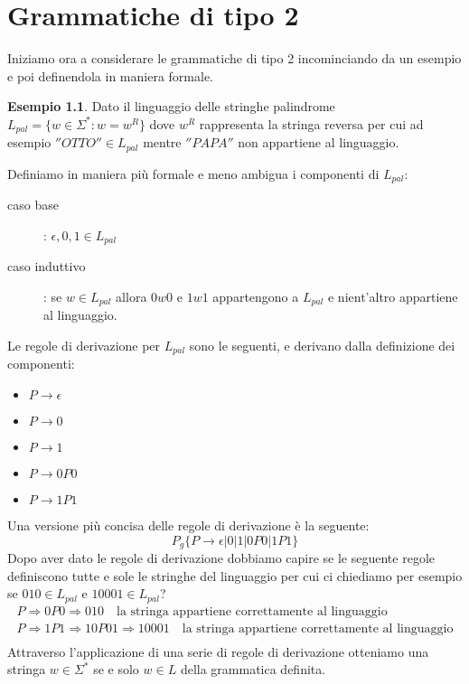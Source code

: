 \documentclass[a4paper]{book}
\theoremstyle{definition}%
\newtheorem*{esempio}{Esempio}
\begin{document}
\chapter{Grammatiche di tipo 2}
Iniziamo ora a considerare le grammatiche di tipo 2 incominciando da un esempio e poi definendola in maniera formale.
\begin{esempio}
  Dato il linguaggio delle stringhe palindrome $L _{pal} = \{w \in \Sigma ^ * : w = w ^ R\}$ dove $w^R$ rappresenta la stringa
  reversa per cui ad esempio $''OTTO'' \in L _ {pal}$ mentre $''PAPA''$ non appartiene al linguaggio.
 
  Definiamo in maniera più formale e meno ambigua i componenti di $L_{pal}$:
  \begin{description}
  \item [caso base]: $\epsilon, 0, 1 \in L_{pal}$
  \item [caso induttivo]: se $w \in L_{pal}$ allora $0w0$ e $1w1$ appartengono a $L_{pal}$ e nient'altro appartiene al linguaggio.
  \end{description}
  Le regole di derivazione per $L_{pal}$ sono le seguenti, e derivano dalla definizione dei componenti:
  \begin{itemize}
  \item $P \to \epsilon$
  \item $P \to 0$
  \item $P \to 1$
  \item $P \to 0P0$
  \item $P \to 1P1$
  \end{itemize}
  Una versione più concisa delle regole di derivazione è la seguente:
  \[ P_g\{P \to \epsilon | 0 | 1 | 0P0 | 1P1\} \]
  Dopo aver dato le regole di derivazione dobbiamo capire se le seguente regole definiscono tutte e sole le stringhe del linguaggio per cui ci chiediamo per esempio se $010 \in L_{pal}$ e $10001 \in L_{pal}$?
  \begin{align}
    P \Rightarrow 0P0 \Rightarrow 010  \quad \text{la stringa appartiene correttamente al linguaggio}\\
    P \Rightarrow 1P1 \Rightarrow 10P01 \Rightarrow 10001 \quad \text{la stringa appartiene correttamente al linguaggio}\\
  \end{align}
  Attraverso l'applicazione di una serie di regole di derivazione otteniamo una stringa $w \in \Sigma ^*$ se e solo $w \in L$
  della grammatica definita.
\end{esempio}
\end{document}
